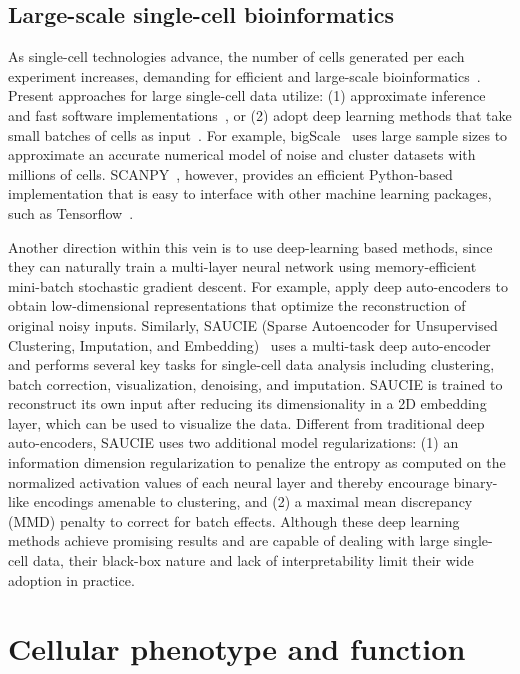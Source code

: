 \documentclass[5p]{elsarticle}
\newcommand{\rev}[1]{{\color{black}#1}}
\begin{document}
\subsection{Large-scale single-cell bioinformatics}

As single-cell technologies advance, the number of cells generated per each experiment increases, demanding for efficient and large-scale bioinformatics~\cite{zheng2017massively}.
Present approaches for large single-cell data utilize: (1) approximate inference~\cite{iacono2018bigscale} and fast software implementations~\cite{wolf2018scanpy}, or (2) adopt deep learning methods that take small batches of cells as input~\cite{lin2017using,amodio2017exploring}.
For example, bigScale~\cite{iacono2018bigscale} uses large sample sizes to approximate an accurate numerical model of noise and cluster datasets with millions of cells.
SCANPY~\cite{wolf2018scanpy}, however, provides an efficient Python-based implementation that is easy to interface with other machine learning packages, such as Tensorflow~\cite{abadi2016tensorflow}.

\rev{Another} direction within this vein is to use deep-learning based methods, since they can naturally train a multi-layer neural network using memory-efficient mini-batch stochastic gradient descent.
For example, \cite{lin2017using} apply deep auto-encoders to obtain low-dimensional representations that optimize the reconstruction of original noisy inputs.
Similarly, SAUCIE (Sparse Autoencoder for Unsupervised Clustering, Imputation, and Embedding)~\cite{amodio2017exploring} uses a multi-task deep auto-encoder and performs several key tasks for single-cell data analysis including clustering, batch correction, visualization, denoising, and imputation.
SAUCIE is trained to reconstruct its own input after reducing its dimensionality in a 2D embedding layer, which can be used to visualize the data.
Different from traditional deep auto-encoders, SAUCIE uses two additional model regularizations: (1) an information dimension regularization to penalize the entropy as computed on the normalized activation values of each neural layer and thereby encourage binary-like encodings amenable to clustering, and (2) a maximal mean discrepancy (MMD) penalty to correct for batch effects.
Although these deep learning methods achieve promising results and are capable \rev{of dealing} with large single-cell data, their black-box nature and lack of interpretability limit their wide adoption in practice.

\section{Cellular phenotype and function}\label{sec:function}
\end{document}
